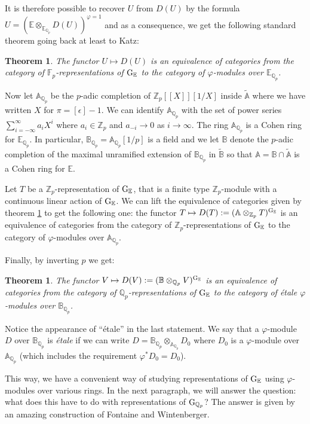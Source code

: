 \documentclass[11pt]{amsart}
\def\Z{{\mathbb Z}_p}
\def\Q{{\mathbb Q}_p}
\def\F{{\mathbb F}_p}
\def\g{{\rm G}_{\Q}}
\def\ra{\rightarrow}
\def\Qp{{\mathbb Q}_p}
\def\aa{\mathbb{A}}
\def\bb{\mathbb{B}}
\def\ee{\mathbb{E}}
\def\ge{{\rm G}_{\ee}}
\def\at{\widetilde{\mathbb{A}}}
\def\bt{\widetilde{\mathbb{B}}}
\newtheorem{thm}[definit]{\bf{Theorem}}
\begin{document}
It is therefore possible to recover $U$ from 
$D(U)$ by the formula $U=(\ee \otimes_{\ee_{\Q}} D(U))^{\varphi=1}$ 
and as a consequence, we get the following standard 
theorem going back at least to Katz: 
 
\begin{thm}\label{nickthecat} 
The functor $U \mapsto D(U)$ is an equivalence 
of categories from the category of $\F$-representations of $\ge$ to 
the category of $\varphi$-modules over $\ee_{\Q}$.  
\end{thm} 
 
Now let $\aa_{\Q}$ be the $p$-adic completion of $\Z[[X]][1/X]$ inside 
$\at$ where we have written $X$ for $\pi=[\epsilon]-1$. We can identify 
$\aa_{\Q}$ with the set of power series $\sum_{i=-\infty}^{\infty} a_i 
X^i$ where $a_i \in \Z$ and $a_{-i} \ra 0$ as $i \ra \infty$. The ring 
$\aa_{\Q}$ is a Cohen ring for $\ee_{\Qp}$. In particular, $\bb_{\Q} = 
\aa_{\Q}[1/p]$ is a field and we let $\bb$ denote the $p$-adic 
completion of the maximal unramified extension of $\bb_{\Qp}$ in $\bt$ 
so that $\aa = \bb \cap \at$ is a Cohen ring for $\ee$.  
 
Let $T$ be a $\Z$-representation of $\ge$, that is a finite type 
$\Z$-module with a continuous linear action of $\ge$. We can lift the 
equivalence of categories 
given by theorem \ref{nickthecat}
to get the following one:  
the functor $T \mapsto D(T) := (\aa \otimes_{\Z} T)^{\ge}$  
is an equivalence of categories from the category of  
$\Z$-representations of $\ge$ to the category of  
$\varphi$-modules over $\aa_{\Q}$.  
 
Finally, by inverting $p$ we get:  
\begin{thm}\label{notnick} 
The functor $V \mapsto D(V) := (\bb \otimes_{\Q} V)^{\ge}$  
is an equivalence of categories from the category of  
$\Q$-representations of $\ge$ to the category of  
\'etale $\varphi$-modules over $\bb_{\Q}$.   
\end{thm} 
 
Notice the appearance of 
``\'etale'' in the last statement. We say that a $\varphi$-module $D$ 
over $\bb_{\Q}$ is \emph{\'etale} if we can write $D = \bb_{\Q} 
\otimes_{\aa_{\Q}} D_0$ where $D_0$ is a $\varphi$-module over 
$\aa_{\Q}$ (which includes the requirement $\varphi^* D_0 = D_0$). 
 
This way, we have a convenient way of studying representations of 
$\ge$ using $\varphi$-modules over various rings. In the next 
paragraph, we will answer the question: what does this have to do with 
representations of $\g$? The answer is given by an amazing 
construction of Fontaine and Wintenberger. 
 
\end{document}
